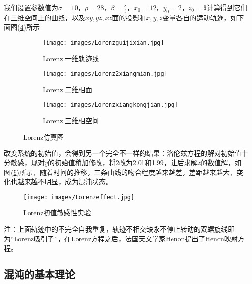        \par
        我们设置参数值为$\sigma = 10$，$\rho = 28$，$\beta = \frac{8}{3}$，$x_0=12$，$y_0=2$，$z_0=9$计算得到它们在三维空间上的曲线，以及$xy,yz,xz$面的投影和$x,y,z$变量各自的运动轨迹，如下面图(\ref{Lorenz仿真图})所示
	    \begin{figure}[H]
	        \centering
	        \begin{subfigure}[b]{0.4\textwidth}
	            \texttt{[image: images/Lorenzguijixian.jpg]}
	            \caption{Lorenz 一维轨迹线}
	            \label{Lorenz 一维轨迹线}
	        \end{subfigure}
	        \begin{subfigure}[b]{0.4\textwidth}
	            \texttt{[image: images/Lorenz2xiangmian.jpg]}
	            \caption{Lorenz 二维相面}
	            \label{Lorenz 二维相面}
	        \end{subfigure}
	        \begin{subfigure}[b]{0.4\textwidth}
	            \texttt{[image: images/Lorenzxiangkongjian.jpg]}
	            \caption{Lorenz 三维相空间}
	            \label{Lorenz 三维相空间}
	        \end{subfigure}
	        \caption{Lorenz仿真图}
	        \label{Lorenz仿真图}
	    \end{figure}
	    \par
        改变系统的初始值，会得到另一个完全不一样的结果：洛伦兹方程的解对初始值十分敏感，现对$y$的初始值稍加修改，将2改为2.01和1.99，让后求解$z$的数值解，如图(\ref{Lorenz初值敏感性实验})所示，随着时间的推移，三条曲线的吻合程度越来越差，差距越来越大，变化也越来越不明显，成为混沌状态。
        \begin{figure}[H]
        \centering
        \texttt{[image: images/Lorenzeffect.jpg]}
        \caption{Lorenz初值敏感性实验}
        \label{Lorenz初值敏感性实验}
        \end{figure}
        注：上面轨迹中的不完全自我重复，轨迹不相交缺永不停止转动的双螺旋线即为“Lorenz吸引子”，在Lorenz方程之后，法国天文学家Henon提出了Henon映射方程。

    \subsection{混沌的基本理论}
